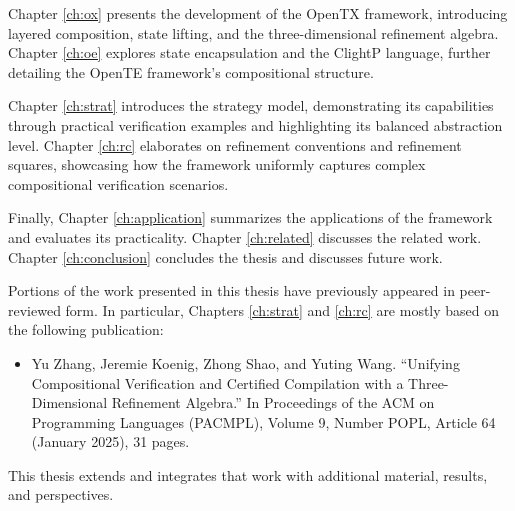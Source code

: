 Chapter \ref{ch:ox} presents the development of
the OpenTX framework,
introducing layered composition,
state lifting,
and the three-dimensional refinement algebra.
Chapter \ref{ch:oe} explores state encapsulation
and the ClightP language,
further detailing the OpenTE framework's compositional structure.

Chapter \ref{ch:strat} introduces the strategy model,
demonstrating its capabilities
through practical verification examples
and highlighting its balanced abstraction level.
Chapter \ref{ch:rc} elaborates on refinement conventions
and refinement squares,
showcasing how the framework uniformly
captures complex compositional verification scenarios.

Finally,
Chapter \ref{ch:application}
summarizes the applications of the framework
and evaluates its practicality.
Chapter \ref{ch:related}
discusses the related work.
Chapter \ref{ch:conclusion}
concludes the thesis and discusses future work.


Portions of the work presented in this thesis
have previously appeared in peer-reviewed form.
In particular, Chapters \ref{ch:strat} and \ref{ch:rc}
are mostly based on the following publication:

\begin{itemize}
  \item Yu Zhang, Jeremie Koenig, Zhong Shao, and Yuting Wang. ``Unifying Compositional Verification and Certified Compilation with a Three-Dimensional Refinement Algebra.'' In Proceedings of the ACM on Programming Languages (PACMPL), Volume 9, Number POPL, Article 64 (January 2025), 31 pages.
\end{itemize}

This thesis extends and integrates that work with additional material, results, and perspectives.
